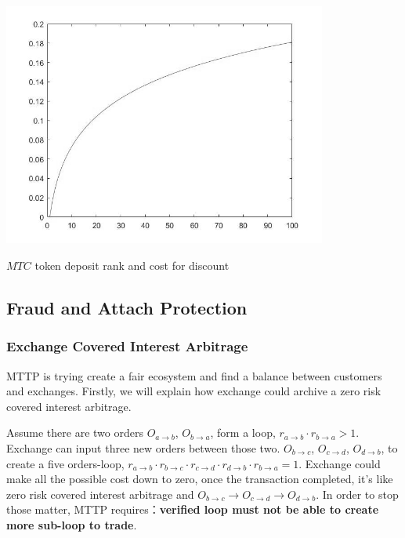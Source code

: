 \documentclass[UTF8,nofonts]{article}
\makeatletter
\newenvironment{figurehere}
 {\def\@captype{figure}}
 {}
\makeatother
\begin{document}
\begin{center}
\begin{figurehere}
\includegraphics[height=8cm]{images/exchange-discount.png}

\caption{$MTC$ token deposit rank and cost for discount}
\label{fig:discount}

\end{figurehere}
\end{center}


\subsection{Fraud and Attach Protection}

\subsubsection{Exchange Covered Interest Arbitrage}

MTTP is trying create a fair ecosystem and find a balance between customers and exchanges. Firstly,  we will explain how exchange could archive a zero risk covered interest arbitrage.

Assume there are two orders $O_{a\rightarrow b}$, $O_{b\rightarrow a}$, form a loop, $r_{a\rightarrow b} \cdot r_{b\rightarrow a} > 1$. Exchange can input three new orders between those two. $O_{b\rightarrow c}$, $O_{c\rightarrow d}$, $O_{d\rightarrow b}$, to create a five orders-loop,  $r_{a\rightarrow b} \cdot r_{b\rightarrow c} \cdot r_{c\rightarrow d}\cdot r_{d\rightarrow b}\cdot r_{b\rightarrow a} = 1$. Exchange could make all the possible cost down to zero, once the transaction completed, it's like zero risk covered interest arbitrage
and $O_{b\rightarrow c}\rightarrow O_{c\rightarrow d}\rightarrow O_{d\rightarrow b}$. In order to stop those matter, MTTP requires：{\bfseries verified loop must not be able to create more sub-loop to trade}.
\end{document}
